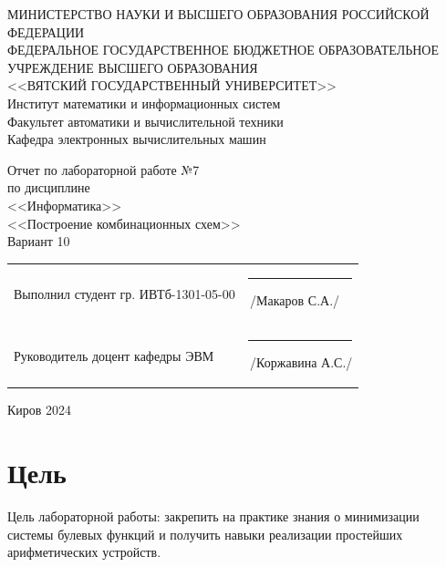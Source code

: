 \documentclass[a4paper,14pt]{extarticle}
\begin{document}
  
  \newpage\thispagestyle{empty}
  \begin{center}
    \MakeUppercase{
      Министерство науки и высшего образования Российской Федерации\\
      Федеральное государственное бюджетное образовательное учреждение высшего образования\\
      <<Вятский Государственный Университет>>\\
    }
    Институт математики и информационных систем\\
    Факультет автоматики и вычислительной техники\\
    Кафедра электронных вычислительных машин
  \end{center}
  \vfill
  
  \begin{center}
    Отчет по лабораторной работе №7\\
    по дисциплине\\
    <<Информатика>>\\
    <<Построение комбинационных схем>>\\
    Вариант 10
  \end{center}
  \vfill
  
  \noindent
  \begin{tabular}{ll}
    Выполнил студент гр. ИВТб-1301-05-00 \hspace{5mm} &
    \rule[-1mm]{25mm}{0.10mm}\,/Макаров С.А./\\
    
    Руководитель доцент кафедры ЭВМ & \rule[-1mm]{25mm}{0.10mm}\,/Коржавина А.С./\\
  \end{tabular}
  
  \vfill
  \begin{center}
    Киров 2024
  \end{center}
  
  \newpage
  \section*{Цель}
  Цель лабораторной работы: закрепить на практике знания о минимизации системы булевых функций и получить навыки реализации простейших арифметических устройств.
  
\end{document}
